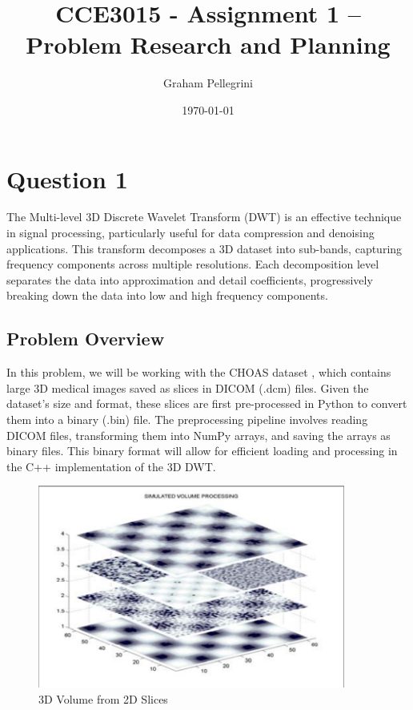 \documentclass{article}
\title{CCE3015 - Assignment 1 – Problem Research and Planning}
\author{Graham Pellegrini}
\date{\today}
\begin{document}
\maketitle
\section{Question 1}
The Multi-level 3D Discrete Wavelet Transform (DWT) is an effective technique in signal processing, particularly useful for data compression and denoising applications. This transform decomposes a 3D dataset into sub-bands, capturing frequency components across multiple resolutions. Each decomposition level separates the data into approximation and detail coefficients, progressively breaking down the data into low and high frequency components.

\subsection{Problem Overview}
In this problem, we will be working with the CHOAS dataset \cite{CHAOSdata2019}, which contains large 3D medical images saved as slices in DICOM (.dcm) files. Given the dataset's size and format, these slices are first pre-processed in Python to convert them into a binary (.bin) file. The preprocessing pipeline involves reading DICOM files, transforming them into NumPy arrays, and saving the arrays as binary files. This binary format will allow for efficient loading and processing in the C++ implementation of the 3D DWT.

\begin{figure}[H]
    \centering
    \includegraphics[width=0.9\textwidth]{assets/slices.png}
    \caption{3D Volume from 2D Slices \cite{Prochazka2011}}
    \label{fig1}
\end{figure}
\end{document}
